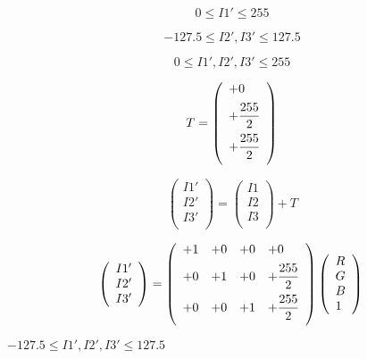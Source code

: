 \documentclass{article}
\begin{document}
\[ 0 \le I1' \le 255 \]
\pagebreak

\[ -127.5 \le I2', I3' \le 127.5 \]
\pagebreak

\[ 0 \le I1', I2', I3' \le 255 \]
\pagebreak

\[ T = \left( \begin{array}{l} +0 \vspace{.5em} \\ +\dfrac{255}{2} \vspace{.5em} \\ +\dfrac{255}{2} \vspace{.5em} \\ \end{array} \right) \]
\pagebreak

\[ \left( \begin{array}{l} I1' \\ I2' \\ I3' \\ \end{array} \right) = \left( \begin{array}{l} I1 \\ I2 \\ I3 \\ \end{array} \right) + T \]
\pagebreak

\[ \left( \begin{array}{l} I1' \\ I2' \\ I3' \\ \end{array} \right) = \left( \begin{array}{llll} +1 & +0 & +0 & +0 \vspace{.5em} \\ +0 & +1 & +0 & +\dfrac{255}{2} \vspace{.5em} \\ +0 & +0 & +1 & +\dfrac{255}{2} \vspace{.5em} \\ \end{array} \right) \left( \begin{array}{l} R \\ G \\ B \\ 1 \\ \end{array} \right) \\ \]
\pagebreak

$ -127.5 \le I1', I2', I3' \le 127.5 $
\pagebreak
\end{document}
